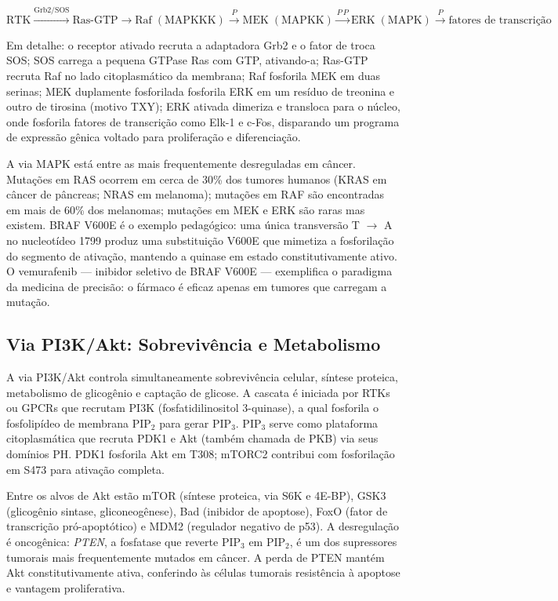 $$\mathrm{RTK} \xrightarrow{\text{Grb2/SOS}} \mathrm{Ras\text{-}GTP}
\xrightarrow{} \mathrm{Raf\;(MAPKKK)} \xrightarrow{P}
\mathrm{MEK\;(MAPKK)} \xrightarrow{P\,P}
\mathrm{ERK\;(MAPK)} \xrightarrow{P}
\text{fatores de transcrição}$$

Em detalhe: o receptor ativado recruta a adaptadora Grb2 e o fator de troca SOS;
SOS carrega a pequena GTPase Ras com GTP, ativando-a; Ras-GTP recruta Raf no
lado citoplasmático da membrana; Raf fosforila MEK em duas serinas; MEK
duplamente fosforilada fosforila ERK em um resíduo de treonina e outro de
tirosina (motivo TXY); ERK ativada dimeriza e transloca para o núcleo, onde
fosforila fatores de transcrição como Elk-1 e c-Fos, disparando um programa de
expressão gênica voltado para proliferação e diferenciação.

A via MAPK está entre as mais frequentemente desreguladas em câncer. Mutações
em RAS ocorrem em cerca de 30\% dos tumores humanos (KRAS em câncer de pâncreas;
NRAS em melanoma); mutações em RAF são encontradas em mais de 60\% dos melanomas;
mutações em MEK e ERK são raras mas existem. BRAF V600E é o exemplo
pedagógico: uma única transversão T $\to$ A no nucleotídeo 1799 produz uma
substituição V600E que mimetiza a fosforilação do segmento de ativação, mantendo
a quinase em estado constitutivamente ativo. O vemurafenib --- inibidor seletivo
de BRAF V600E --- exemplifica o paradigma da medicina de precisão: o fármaco é
eficaz apenas em tumores que carregam a mutação.

\subsection{Via PI3K/Akt: Sobrevivência e Metabolismo}
\label{subsec:09-pi3k}

A via PI3K/Akt controla simultaneamente sobrevivência celular, síntese
proteica, metabolismo de glicogênio e captação de glicose. A cascata é
iniciada por RTKs ou GPCRs que recrutam PI3K (fosfatidilinositol 3-quinase),
a qual fosforila o fosfolipídeo de membrana PIP$_2$ para gerar PIP$_3$. PIP$_3$
serve como plataforma citoplasmática que recruta PDK1 e Akt (também chamada
de PKB) via seus domínios PH. PDK1 fosforila Akt em T308; mTORC2 contribui
com fosforilação em S473 para ativação completa.

Entre os alvos de Akt estão mTOR (síntese proteica, via S6K e 4E-BP), GSK3
(glicogênio sintase, gliconeogênese), Bad (inibidor de apoptose), FoxO
(fator de transcrição pró-apoptótico) e MDM2 (regulador negativo de p53).
A desregulação é oncogênica: \emph{PTEN}, a fosfatase que reverte PIP$_3$ em
PIP$_2$, é um dos supressores tumorais mais frequentemente mutados em câncer.
A perda de PTEN mantém Akt constitutivamente ativa, conferindo às células
tumorais resistência à apoptose e vantagem proliferativa.


